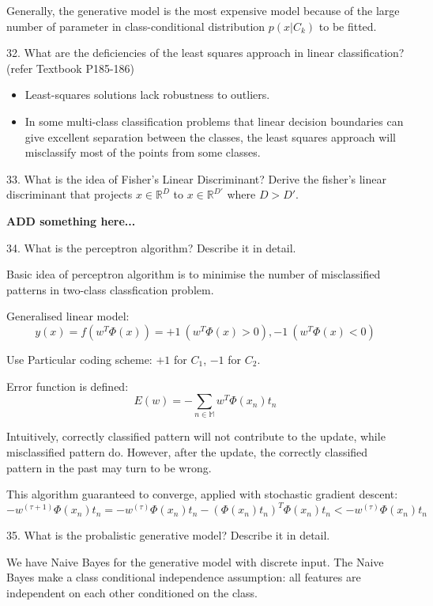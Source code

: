 \documentclass[11pt,a4paper]{article}
\newcommand{\BOLD}[1]{\textbf{#1}}
\begin{document}
    Generally, the generative model is the most expensive model because of the large number of parameter in class-conditional distribution $p(x| C_k)$ to be fitted. 

    32. What are the deficiencies of the least squares approach in linear classification? (refer Textbook P185-186)
    
    \begin{itemize}
    \item Least-squares solutions lack robustness to outliers.

    \item In some multi-class classification problems that linear decision boundaries can give excellent separation between the classes, the least squares approach will misclassify most of the points from some classes.
    \end{itemize}
    
33. What is the idea of Fisher's Linear Discriminant? Derive the fisher's linear discriminant that projects $x \in \mathbb{R}^D$ to $x \in \mathbb{R}^{D'}$ where $D > D'$.

    \BOLD{ADD something here...}

34. What is the perceptron algorithm? Describe it in detail.

    Basic idea of perceptron algorithm is to minimise the number of misclassified patterns in two-class classfication problem.

    Generalised linear model:
    $$ y(x) = f( w^T \Phi(x) ) = + 1 \ (w^T \Phi(x) > 0), -1 \ (w^T \Phi(x) < 0) $$

    Use Particular coding scheme: $+1$ for $C_1$, $-1$ for $C_2$.

    Error function is defined: 
    $$ E(w) = - \sum_{n\in \mathbb{M}} w^T \Phi(x_n) t_n $$

    Intuitively, correctly classified pattern will not contribute to the update, while misclassified pattern do. However, after the update, the correctly classified pattern in the past may turn to be wrong. 

    This algorithm guaranteed to converge, applied with stochastic gradient descent:
    $$ - w^{(\tau + 1)} \Phi(x_n) t_n = - w^{(\tau)} \Phi(x_n) t_n - (\Phi(x_n) t_n)^T \Phi(x_n) t_n < - w^{(\tau)} \Phi(x_n) t_n $$

35. What is the probalistic generative model? Describe it in detail.

    We have Naive Bayes for the generative model with discrete input. The Naive Bayes make a class conditional independence assumption: all features are independent on each other conditioned on the class.
\end{document}

